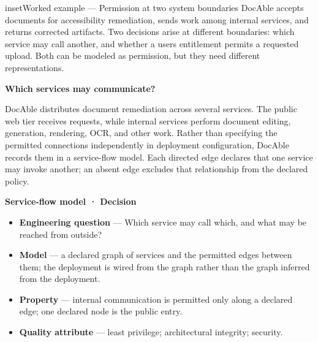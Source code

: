 \begin{bookbox}{inset}{Worked example --- Permission at two system boundaries}
\label{inset-docable-decisions}
DocAble accepts documents for accessibility remediation, sends work among internal services, and returns corrected artifacts. Two decisions arise at different boundaries: which service may call another, and whether a user\textquotesingle s entitlement permits a requested upload. Both can be modeled as permission, but they need different representations.

\textbf{Which services may communicate?}

DocAble distributes document remediation across several services. The public web tier receives requests, while internal services perform document editing, generation, rendering, OCR, and other work. Rather than specifying the permitted connections independently in deployment configuration, DocAble records them in a service-flow model. Each directed edge declares that one service may invoke another; an absent edge excludes that relationship from the declared policy.

\textbf{Service-flow model · Decision}

\begin{itemize}
\tightlist
\item
  \textbf{Engineering question} --- Which service may call which, and what may be reached from outside?
\end{itemize}

\begin{itemize}
\tightlist
\item
  \textbf{Model} --- a declared graph of services and the permitted edges between them; the deployment is wired from the graph rather than the graph inferred from the deployment.
\end{itemize}

\begin{itemize}
\tightlist
\item
  \textbf{Property} --- internal communication is permitted only along a declared edge; one declared node is the public entry.
\end{itemize}

\begin{itemize}
\tightlist
\item
  \textbf{Quality attribute} --- least privilege; architectural integrity; security.
\end{itemize}



\end{bookbox}

